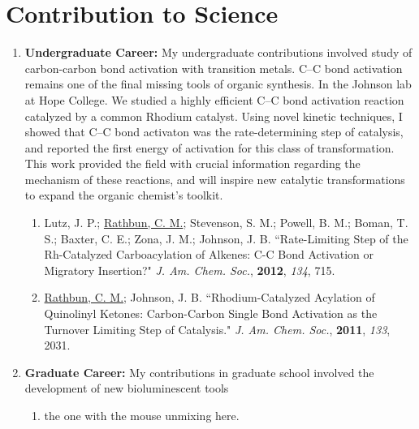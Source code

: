 \documentclass{nihbiosketch}
\begin{document}

\section{Contribution to Science}

\begin{enumerate}

\item \textbf{Undergraduate Career:} My undergraduate contributions involved study of carbon-carbon bond activation with transition metals. C--C bond activation remains one of the final missing tools of organic synthesis. In the Johnson lab at Hope College. We studied a highly efficient C--C bond activation reaction catalyzed by a common Rhodium catalyst. Using novel kinetic techniques, I showed that C--C bond activaton was the rate-determining step of catalysis, and reported the first energy of activation for this class of transformation. This work provided the field with crucial information regarding the mechanism of these reactions, and will inspire new catalytic transformations to expand the organic chemist's toolkit.

\begin{enumerate}

  \item Lutz, J. P.; \underline{Rathbun, C. M.}; Stevenson, S. M.; Powell, B. M.; Boman, T. S.; Baxter, C. E.; Zona, J. M.; Johnson, J. B. ``Rate-Limiting Step of the Rh-Catalyzed Carboacylation of Alkenes: C-C Bond Activation or Migratory Insertion?" \textit{J. Am. Chem. Soc.}, \textbf{2012}, \textit{134}, 715.

  \item \underline{Rathbun, C. M.}; Johnson, J. B. ``Rhodium-Catalyzed Acylation of Quinolinyl Ketones: Carbon-Carbon Single Bond Activation as the Turnover Limiting Step of Catalysis." \textit{J. Am. Chem. Soc.}, \textbf{2011}, \textit{133}, 2031.

\end{enumerate}


\item \textbf{Graduate Career:} My contributions in graduate school involved the development of new bioluminescent tools %

\begin{enumerate}

  \item the one with the mouse unmixing here. %


\end{enumerate}
\end{enumerate}
\end{document}
